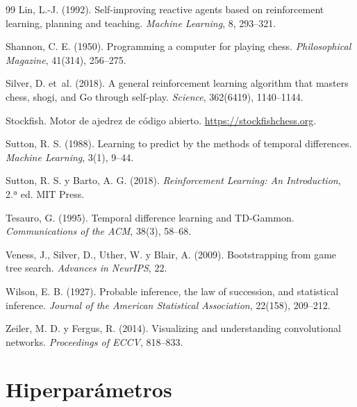 \documentclass[11pt,a4paper]{article}
\begin{document}
\begin{thebibliography}{99}
Lin, L.-J. (1992). Self-improving reactive agents based on reinforcement
learning, planning and teaching. \textit{Machine Learning}, 8, 293--321.

Shannon, C. E. (1950). Programming a computer for playing chess.
\textit{Philosophical Magazine}, 41(314), 256--275.

Silver, D. et~al. (2018). A general reinforcement learning algorithm that
masters chess, shogi, and Go through self-play. \textit{Science}, 362(6419),
1140--1144.

Stockfish. Motor de ajedrez de código abierto.
\url{https://stockfishchess.org}.

Sutton, R. S. (1988). Learning to predict by the methods of temporal
differences. \textit{Machine Learning}, 3(1), 9--44.

Sutton, R. S. y Barto, A. G. (2018). \textit{Reinforcement Learning: An
Introduction}, 2.ª ed. MIT Press.

Tesauro, G. (1995). Temporal difference learning and TD-Gammon.
\textit{Communications of the ACM}, 38(3), 58--68.

Veness, J., Silver, D., Uther, W. y Blair, A. (2009). Bootstrapping from
game tree search. \textit{Advances in NeurIPS}, 22.

Wilson, E. B. (1927). Probable inference, the law of succession, and
statistical inference. \textit{Journal of the American Statistical
Association}, 22(158), 209--212.

Zeiler, M. D. y Fergus, R. (2014). Visualizing and understanding
convolutional networks. \textit{Proceedings of ECCV}, 818--833.

\end{thebibliography}

\appendix
\clearpage
\section{Hiperparámetros}
\label{anx:hiper}
\end{document}
